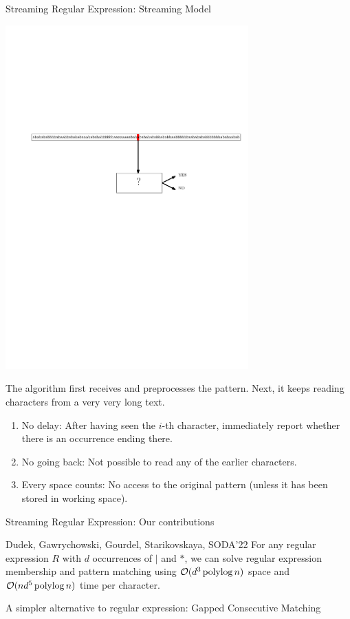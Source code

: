 \documentclass[aspectratio=169]{beamer}
\begin{document}
\begin{frame}{Streaming Regular Expression: Streaming Model}
\begin{center}
    \includegraphics[width=0.7\textwidth]{pictures/stream3}
\end{center}

\medskip

The algorithm first receives and preprocesses the pattern. Next,
it keeps reading characters from a very very long text.

\smallskip
\pause
\begin{enumerate}
\item No delay: After having seen the $i$-th character, immediately report whether there is an
occurrence ending there.
\pause
\item No going back: Not possible to read any of the earlier characters.
\pause
\item Every space counts: No access to the original pattern (unless it has been stored in working space).
\end{enumerate}
\end{frame}

\begin{frame}{Streaming Regular Expression: Our contributions}
    \begin{alertblock}{Dudek, Gawrychowski, Gourdel, Starikovskaya, SODA'22}
        For any regular expression $R$ with $d$ occurrences of $|$ and $\ast$, we can solve regular expression membership
        and pattern matching using $\mathcal{O}(d^{3}\operatorname{polylog} n)$ space and $\mathcal{O}(nd^{5}\operatorname{polylog} n)$ time per character.
    \end{alertblock}
\end{frame}

\begin{frame}{A simpler alternative to regular expression: Gapped Consecutive Matching}
\end{frame}
\end{document}
